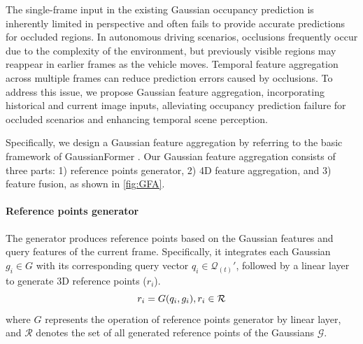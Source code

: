 \documentclass[journal]{IEEEtran}
\begin{document}
The single-frame input in the existing Gaussian occupancy prediction is inherently limited in perspective and often fails to provide accurate predictions for occluded regions. 
In autonomous driving scenarios, occlusions frequently occur due to the complexity of the environment, but previously visible regions may reappear in earlier frames as the vehicle moves. 
Temporal feature aggregation across multiple frames can reduce prediction errors caused by occlusions. 
To address this issue, we propose Gaussian feature aggregation, incorporating historical and current image inputs, alleviating occupancy prediction failure for occluded scenarios and enhancing temporal scene perception.

Specifically, we design a Gaussian feature aggregation by referring to the basic framework of GaussianFormer 
\cite{huang2024gaussianformer}.
Our Gaussian feature aggregation consists of three parts: 1) reference points generator, 2) 4D feature aggregation, and 3) feature fusion, as shown in \autoref{fig:GFA}.

\noindent
\paragraph{Reference points generator}
The generator produces reference points based on the Gaussian features and query features of the current frame.
Specifically, it integrates each Gaussian {\small $g_i \in G$} with its corresponding query vector {\small $q_i \in \mathcal{Q}_{(t)}'$}, followed by a linear layer to generate 3D reference points ($r_i$).
\begin{equation}\small
r_i = G(q_i, g_i),r_i \in \mathcal{R}
\end{equation}
where {\small $G$} represents the operation of reference points generator by linear layer, and {$\mathcal{R}$} denotes the set of all generated reference points of the Gaussians $\mathcal{G}$.

\noindent
\end{document}
